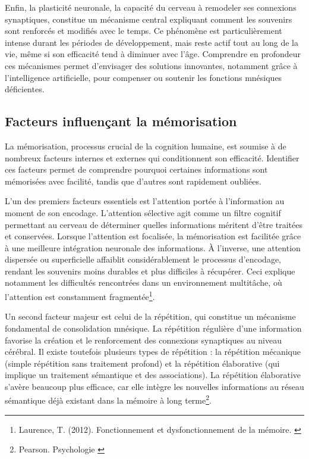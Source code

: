 \documentclass[11pt,a4paper]{report}
\begin{document}
Enfin, la plasticité neuronale, la capacité du cerveau à remodeler ses connexions synaptiques, constitue un mécanisme central expliquant comment les souvenirs sont renforcés et modifiés avec le temps. Ce phénomène est particulièrement intense durant les périodes de développement, mais reste actif tout au long de la vie, même si son efficacité tend à diminuer avec l'âge. Comprendre en profondeur ces mécanismes permet d’envisager des solutions innovantes, notamment grâce à l’intelligence artificielle, pour compenser ou soutenir les fonctions mnésiques déficientes.

\vspace{0.5cm}

\subsection{Facteurs influençant la mémorisation}
La mémorisation, processus crucial de la cognition humaine, est soumise à de nombreux facteurs internes et externes qui conditionnent son efficacité. Identifier ces facteurs permet de comprendre pourquoi certaines informations sont mémorisées avec facilité, tandis que d’autres sont rapidement oubliées.

L’un des premiers facteurs essentiels est l’attention portée à l’information au moment de son encodage. L’attention sélective agit comme un filtre cognitif permettant au cerveau de déterminer quelles informations méritent d’être traitées et conservées. Lorsque l’attention est focalisée, la mémorisation est facilitée grâce à une meilleure intégration neuronale des informations. À l’inverse, une attention dispersée ou superficielle affaiblit considérablement le processus d’encodage, rendant les souvenirs moins durables et plus difficiles à récupérer. Ceci explique notamment les difficultés rencontrées dans un environnement multitâche, où l’attention est constamment fragmentée\footnote{Laurence, T. (2012). Fonctionnement et dysfonctionnement de la mémoire. \cite{taconnat}}.

Un second facteur majeur est celui de la répétition, qui constitue un mécanisme fondamental de consolidation mnésique. La répétition régulière d’une information favorise la création et le renforcement des connexions synaptiques au niveau cérébral. Il existe toutefois plusieurs types de répétition : la répétition mécanique (simple répétition sans traitement profond) et la répétition élaborative (qui implique un traitement sémantique et des associations). La répétition élaborative s’avère beaucoup plus efficace, car elle intègre les nouvelles informations au réseau sémantique déjà existant dans la mémoire à long terme\footnote{Pearson. Psychologie \cite{pearson}}.
\end{document}
